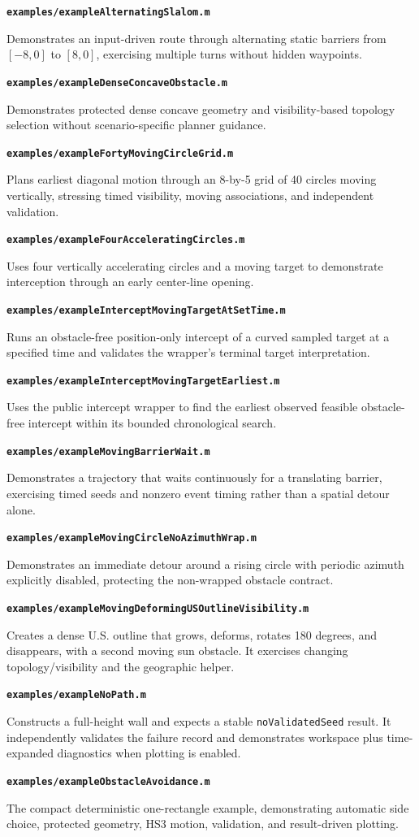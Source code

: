 \documentclass[10pt,letterpaper]{article}
\newcommand{\file}[1]{\nolinkurl{#1}}
\newcommand{\scriptentry}[2]{%
  \par\medskip\noindent\textbf{\file{#1}}\par
  \begingroup\raggedright #2\par\endgroup
}
\begin{document}
\scriptentry{examples/exampleAlternatingSlalom.m}{Demonstrates an input-driven
route through alternating static barriers from $[-8,0]$ to $[8,0]$, exercising
multiple turns without hidden waypoints.}

\scriptentry{examples/exampleDenseConcaveObstacle.m}{Demonstrates protected
dense concave geometry and visibility-based topology selection without
scenario-specific planner guidance.}

\scriptentry{examples/exampleFortyMovingCircleGrid.m}{Plans earliest diagonal
motion through an 8-by-5 grid of 40 circles moving vertically, stressing timed
visibility, moving associations, and independent validation.}

\scriptentry{examples/exampleFourAcceleratingCircles.m}{Uses four vertically
accelerating circles and a moving target to demonstrate interception through an
early center-line opening.}

\scriptentry{examples/exampleInterceptMovingTargetAtSetTime.m}{Runs an
obstacle-free position-only intercept of a curved sampled target at a specified
time and validates the wrapper's terminal target interpretation.}

\scriptentry{examples/exampleInterceptMovingTargetEarliest.m}{Uses the public
intercept wrapper to find the earliest observed feasible obstacle-free intercept
within its bounded chronological search.}

\scriptentry{examples/exampleMovingBarrierWait.m}{Demonstrates a trajectory
that waits continuously for a translating barrier, exercising timed seeds and
nonzero event timing rather than a spatial detour alone.}

\scriptentry{examples/exampleMovingCircleNoAzimuthWrap.m}{Demonstrates an
immediate detour around a rising circle with periodic azimuth explicitly
disabled, protecting the non-wrapped obstacle contract.}

\scriptentry{examples/exampleMovingDeformingUSOutlineVisibility.m}{Creates a
dense U.S. outline that grows, deforms, rotates 180 degrees, and disappears,
with a second moving sun obstacle. It exercises changing topology/visibility and
the geographic helper.}

\scriptentry{examples/exampleNoPath.m}{Constructs a full-height wall and
expects a stable \file{noValidatedSeed} result. It independently validates the
failure record and demonstrates workspace plus time-expanded diagnostics when
plotting is enabled.}

\scriptentry{examples/exampleObstacleAvoidance.m}{The compact deterministic
one-rectangle example, demonstrating automatic side choice, protected geometry,
HS3 motion, validation, and result-driven plotting.}
\end{document}
